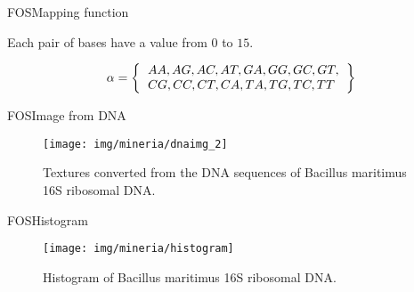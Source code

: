 \documentclass[10pt]{beamer}
\newcommand{\1}{
	\setbeamertemplate{background}{
		\texttt{[image: img/1]}
		\tikz[overlay] \fill[fill opacity=0.75,fill=white] (0,0) rectangle (-\paperwidth,\paperheight);
	}
}
\begin{document}
\begin{frame}{FOS}{Mapping function }
	\begin{block}{}
		Each pair of bases have a value from $0$ to $15$.
		
		\begin{equation}
		\alpha = \left\lbrace \begin{tabular}{l}
		$AA, AG, AC, AT, GA, GG, GC, GT,$\\
		$CG, CC, CT, CA, TA, TG, TC, TT$
		\end{tabular}      
		\right\rbrace
		\end{equation}
		
	\end{block}
\end{frame}


\begin{frame}{FOS}{Image from DNA}
	\begin{figure}[]
		\centering
		\texttt{[image: img/mineria/dnaimg\_2]}
		\label{img:mot2}
		\caption{Textures converted from the DNA sequences of Bacillus maritimus 16S ribosomal DNA.}
	\end{figure}
\end{frame}

\begin{frame}{FOS}{Histogram}
	\begin{figure}[]
		\centering
		\texttt{[image: img/mineria/histogram]}
		\label{img:mot2}
		\caption{Histogram of Bacillus maritimus 16S ribosomal DNA. }
	\end{figure}
\end{frame}
\end{document}
